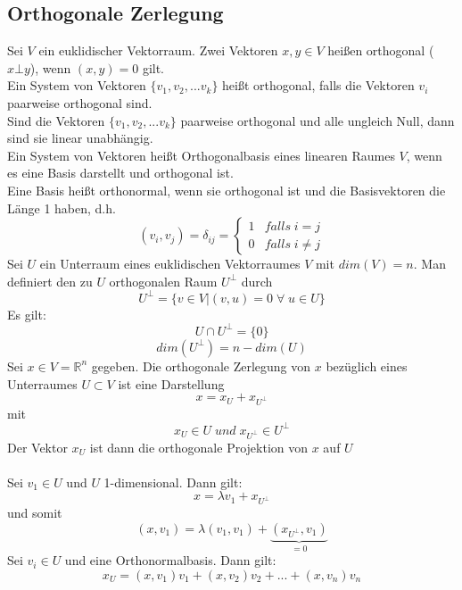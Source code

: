 \documentclass[a4paper,twocolumn,10pt]{article}
\begin{document}
\subsection{Orthogonale Zerlegung}
Sei $V$ ein euklidischer Vektorraum. Zwei Vektoren $x,y\in V$ heißen orthogonal ($x\bot y$), wenn $(x,y)=0$ gilt.\\
Ein System von Vektoren $\{v_1,v_2,...v_k\}$ heißt orthogonal, falls die Vektoren $v_i$ paarweise orthogonal sind.\\
Sind die Vektoren $\{v_1,v_2,...v_k\}$ paarweise orthogonal und alle ungleich Null, dann sind sie linear unabhängig.\\
Ein System von Vektoren heißt Orthogonalbasis eines linearen Raumes $V$, wenn es eine Basis darstellt und orthogonal ist.\\
Eine Basis heißt orthonormal, wenn sie orthogonal ist und die Basisvektoren die Länge 1 haben, d.h.
\begin{equation*}
(v_i,v_j)=\delta_{ij}=\begin{cases}1 & falls\;i=j \\ 0 & falls\;i\neq j\end{cases}
\end{equation*}
Sei $U$ ein Unterraum eines euklidischen Vektorraumes $V$ mit $dim(V)=n$. Man definiert den zu $U$ orthogonalen Raum $U^{\bot}$ durch
\begin{equation*}
U^{\bot}=\{v\in V|(v,u)=0\;\forall\;u\in U\}
\end{equation*}
Es gilt:
\begin{equation*}
U\cap U^{\bot}=\{0\}
\end{equation*}
\begin{equation*}
dim(U^{\bot})=n-dim(U)
\end{equation*}
Sei $x\in V=\mathbb{R}^n$ gegeben. Die orthogonale Zerlegung von $x$ bezüglich eines Unterraumes $U\subset V$ ist eine Darstellung
\begin{equation*}
x=x_U+x_{U^{\bot}}
\end{equation*}
mit
\begin{equation*}
x_U\in U\;und\;x_{U^{\bot}}\in U^{\bot}
\end{equation*}
Der Vektor $x_U$ ist dann die orthogonale Projektion von $x$ auf $U$\\\\
Sei $v_1\in U$ und $U$ 1-dimensional. Dann gilt:
\begin{equation*}
x=\lambda v_1+x_{U^{\bot}}
\end{equation*}
und somit
\begin{equation*}
(x,v_1)=\lambda(v_1,v_1)+\underbrace{(x_{U^{\bot}},v_1)}_{=0}
\end{equation*}
Sei $v_i\in U$ und eine Orthonormalbasis. Dann gilt:
\begin{equation*}
x_U=(x,v_1)v_1+(x,v_2)v_2+...+(x,v_n)v_n
\end{equation*}
\end{document}
